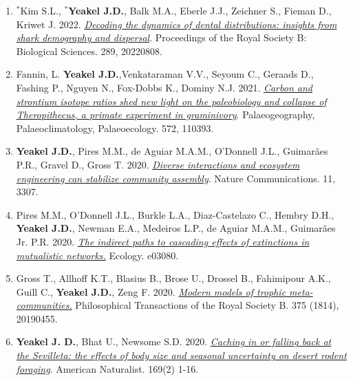 \documentclass[margin,line,12pt]{res}
\begin{document}
\begin{resume}
\begin{enumerate}
\item ${}^\ast$Kim S.L., \textbf{${}^\ast$Yeakel J.D.}, Balk M.A., Eberle J.J., Zeichner S., Fieman D., Kriwet J. 2022. \href{https://doi.org/10.1098/rspb.2022.0808}{\emph{Decoding the dynamics of dental distributions: insights from shark demography and dispersal}}. Proceedings of the Royal Society B: Biological Sciences. 289, 20220808.

\item Fannin, L. \textbf{Yeakel J.D.},Venkataraman V.V., Seyoum C., Geraads D., Fashing P., Nguyen N., Fox-Dobbs K., Dominy N.J.  2021. \href{https://doi.org/10.1016/j.palaeo.2021.110393}{\emph{ Carbon and strontium isotope ratios shed new light on the paleobiology and collapse of Theropithecus, a primate experiment in graminivory}}. Palaeogeography, Palaeoclimatology, Palaeoecology. 572, 110393.

\item \textbf{Yeakel J.D.}, Pires M.M., de Aguiar M.A.M., O'Donnell J.L., Guimar\~aes P.R., Gravel D., Gross T. 2020. \href{https://www.nature.com/articles/s41467-020-17164-x}{\emph{Diverse interactions and ecosystem engineering can stabilize community assembly}}. Nature Communications. 11, 3307.

\item Pires M.M., O'Donnell J.L., Burkle L.A., Diaz-Castelazo C., Hembry D.H., \textbf{Yeakel J.D.}, Newman E.A., Medeiros L.P., de Aguiar M.A.M., Guimar\~aes Jr. P.R. 2020. \href{https://esajournals.onlinelibrary.wiley.com/doi/pdf/10.1002/ecy.3080}{\emph{The indirect paths to cascading effects of extinctions in mutualistic networks.}} Ecology. e03080.

\item Gross T., Allhoff K.T., Blasius B., Brose U., Drossel B., Fahimipour A.K., Guill C., \textbf{Yeakel J.D.}, Zeng F. 2020. \href{https://royalsocietypublishing.org/doi/pdf/10.1098/rstb.2019.0455}{\emph{Modern models of trophic meta-communities.}} Philosophical Transactions of the Royal Society B. 375 (1814), 20190455.

\item \textbf{Yeakel J. D.}, Bhat U., Newsome S.D. 2020. \href{https://www.journals.uchicago.edu/doi/10.1086/709019}{\emph{Caching in or falling back at the Sevilleta: the effects of body size and seasonal uncertainty on desert rodent foraging}}. American Naturalist. 169(2) 1-16.


\end{enumerate}
\end{resume}
\end{document}
